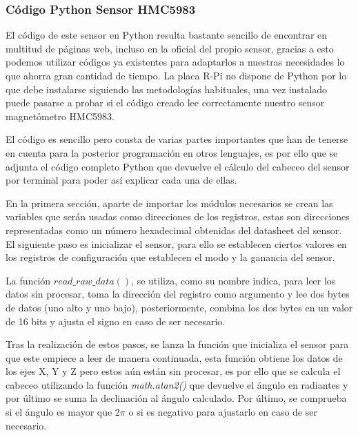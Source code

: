 \subsubsection{Código Python Sensor HMC5983}

El código de este sensor en Python resulta bastante sencillo de encontrar en multitud de páginas web, incluso en la oficial del propio sensor, gracias a esto podemos utilizar códigos ya existentes para adaptarlos a nuestras necesidades lo que ahorra gran cantidad de tiempo. La placa R-Pi no dispone de Python por lo que debe instalarse siguiendo las metodologías habituales, una vez instalado puede pasarse a probar si el código creado lee correctamente nuestro sensor magnetómetro HMC5983. 

El código es sencillo pero consta de varias partes importantes que han de tenerse en cuenta para la posterior programación en otros lenguajes, es por ello que se adjunta el código completo Python que devuelve el cálculo del cabeceo del sensor por terminal para poder así explicar cada una de ellas.

En la primera sección, aparte de importar los módulos necesarios se crean las variables que serán usadas como direcciones de los registros, estas son direcciones representadas como un número hexadecimal obtenidas del datasheet del sensor. El siguiente paso es inicializar el sensor, para ello se establecen ciertos valores en los registros de configuración que establecen el modo y la ganancia del sensor.

La función $read\_raw\_data()$, se utiliza, como su nombre indica, para leer los datos sin procesar, toma la dirección del registro como argumento y lee dos bytes de datos (uno alto y uno bajo), posteriormente, combina los dos bytes en un valor de 16 bits y ajusta el signo en caso de ser necesario.

Tras la realización de estos pasos, se lanza la función que inicializa el sensor para que este empiece a leer de manera continuada, esta función obtiene los datos de los ejes X, Y y Z pero estos aún están sin procesar, es por ello que se calcula el cabeceo utilizando la función \textit{math.atan2()} que devuelve el ángulo en radiantes y por último se suma la declinación al ángulo calculado. Por último, se comprueba si el ángulo es mayor que 2$\pi$ o si es negativo para ajustarlo en caso de ser necesario.\\

